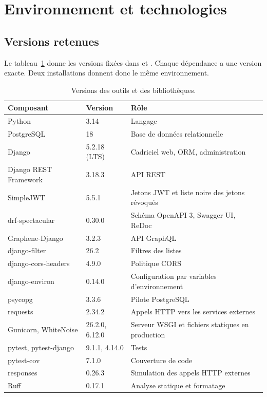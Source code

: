 \section{Environnement et technologies}
\label{sec:environnement}

\subsection{Versions retenues}

Le tableau~\ref{tab:versions} donne les versions fixées dans  et . Chaque dépendance a une version exacte. Deux installations donnent donc le même environnement.

\begin{table}[H]
  \centering
  \small
  \caption{Versions des outils et des bibliothèques.}
  \label{tab:versions}
  \begin{tabularx}{\linewidth}{@{}l l X@{}}
    \toprule
    \textbf{Composant} & \textbf{Version} & \textbf{Rôle} \\
    \midrule
    Python & 3.14 & Langage \\
    PostgreSQL & 18 & Base de données relationnelle~\cite{postgresql} \\
    Django & 5.2.18 (LTS) & Cadriciel web, ORM, administration~\cite{django} \\
    Django REST Framework & 3.18.3 & API REST~\cite{drf} \\
    SimpleJWT & 5.5.1 & Jetons JWT et liste noire des jetons révoqués~\cite{simplejwt} \\
    drf-spectacular & 0.30.0 & Schéma OpenAPI 3, Swagger UI, ReDoc~\cite{spectacular} \\
    Graphene-Django & 3.2.3 & API GraphQL~\cite{graphene} \\
    django-filter & 26.2 & Filtres des listes \\
    django-cors-headers & 4.9.0 & Politique CORS \\
    django-environ & 0.14.0 & Configuration par variables d'environnement \\
    psycopg & 3.3.6 & Pilote PostgreSQL \\
    requests & 2.34.2 & Appels HTTP vers les services externes \\
    Gunicorn, WhiteNoise & 26.2.0, 6.12.0 & Serveur WSGI et fichiers statiques en production \\
    \midrule
    pytest, pytest-django & 9.1.1, 4.14.0 & Tests \\
    pytest-cov & 7.1.0 & Couverture de code \\
    responses & 0.26.3 & Simulation des appels HTTP externes \\
    Ruff & 0.17.1 & Analyse statique et formatage \\
    \bottomrule
  \end{tabularx}
\end{table}

